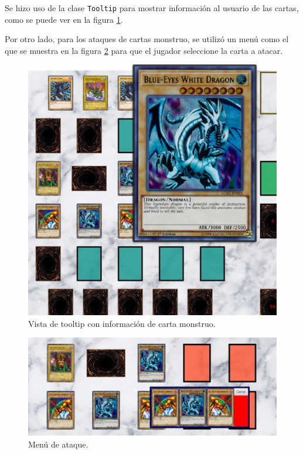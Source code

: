 	Se hizo uso de la clase \texttt{Tooltip} para mostrar información al usuario de las cartas, como se puede ver en la figura \ref{vista_tooltip_carta}.
	
	Por otro lado, para los ataques de cartas monstruo, se utilizó un menú como el que se muestra en la figura \ref{vista_ataque} para que el jugador seleccione la carta a atacar.
	\begin{figure}[H]
		\centering
		\includegraphics[scale=0.3]{includes/vista_tooltip_carta}
		\caption{Vista de tooltip con información de carta monstruo.}
		\label{vista_tooltip_carta}
	\end{figure}
	
	\begin{figure}[H]
		\centering
		\includegraphics[scale=0.5]{includes/vista_ataque}
		\caption{Menú de ataque.}
		\label{vista_ataque}
	\end{figure}
	
